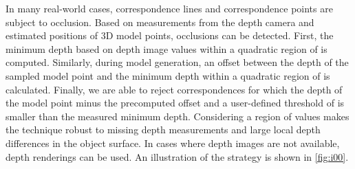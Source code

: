 \documentclass[10pt,twocolumn,letterpaper]{article}
\begin{document}
In many real-world cases, correspondence lines and correspondence points are subject to occlusion.
Based on measurements from the depth camera and estimated positions of 3D model points, occlusions can be detected.
First, the minimum depth based on  depth image values within a quadratic region of  is computed.
Similarly, during model generation, an offset between the depth of the sampled model point and the minimum depth within a quadratic region of  is calculated.
Finally, we are able to reject correspondences for which the depth of the model point minus the precomputed offset and a user-defined threshold of  is smaller than the measured minimum depth.
Considering a region of values makes the technique robust to missing depth measurements and large local depth differences in the object surface.
In cases where depth images are not available, depth renderings can be used.
An illustration of the strategy is shown in \cref{fig:i00}.
\end{document}
